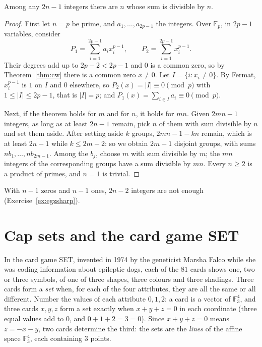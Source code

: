 \begin{theorem}\label{thm:egz}
Among any $2n-1$ integers there are $n$ whose sum is divisible by $n$.
\end{theorem}
\begin{proof}
First let $n=p$ be prime, and $a_1,\dots,a_{2p-1}$ the integers. Over $\mathbb F_p$, in $2p-1$ variables, consider
\[
P_1=\sum_{i=1}^{2p-1}a_ix_i^{p-1},\qquad P_2=\sum_{i=1}^{2p-1}x_i^{p-1}.
\]
Their degrees add up to $2p-2<2p-1$ and $0$ is a common zero, so by Theorem~\ref{thm:cw} there is a common zero $x\ne0$. Let $I=\{i:x_i\ne0\}$. By Fermat, $x_i^{p-1}$ is $1$ on $I$ and $0$ elsewhere, so
$P_2(x)=|I|\equiv0\pmod p$ with $1\le|I|\le2p-1$, that is $|I|=p$; and $P_1(x)=\sum_{i\in I}a_i\equiv0\pmod p$.

Next, if the theorem holds for $m$ and for $n$, it holds for $mn$. Given $2mn-1$ integers, as long as at least $2n-1$ remain, pick $n$ of them with sum divisible by $n$ and set them aside. After setting aside
$k$ groups, $2mn-1-kn$ remain, which is at least $2n-1$ while $k\le2m-2$: so we obtain $2m-1$ disjoint groups, with sums $nb_1,\dots,nb_{2m-1}$. Among the $b_j$, choose $m$ with sum divisible by $m$; the
$mn$ integers of the corresponding groups have a sum divisible by $mn$. Every $n\ge2$ is a product of primes, and $n=1$ is trivial.
\end{proof}

With $n-1$ zeros and $n-1$ ones, $2n-2$ integers are not enough (Exercise~\ref{ex:egzsharp}).

\section{Cap sets and the card game SET}

In the card game SET, invented in 1974 by the geneticist Marsha Falco while she was coding information about epileptic dogs, each of the $81$ cards shows one, two or three symbols, of one of three shapes,
three colours and three shadings. Three cards form a \emph{set} when, for each of the four attributes, they are all the same or all different. Number the values of each attribute $0,1,2$: a card is a vector
of $\mathbb F_3^4$, and three cards $x,y,z$ form a set exactly when $x+y+z=0$ in each coordinate (three equal values add to $0$, and $0+1+2=3=0$). Since $x+y+z=0$ means $z=-x-y$, two cards determine the
third: the sets are the \emph{lines} of the affine space $\mathbb F_3^4$, each containing $3$ points.

